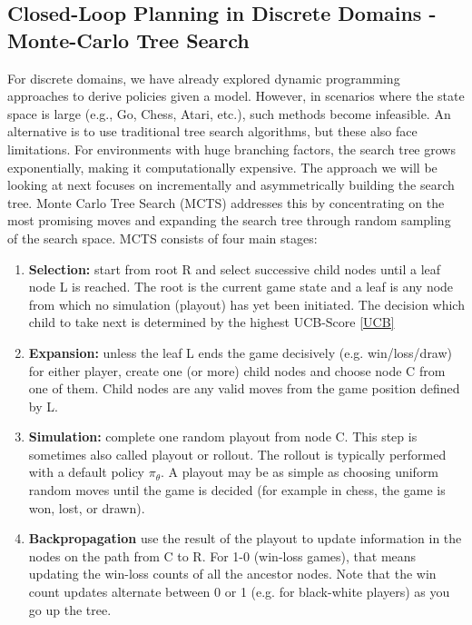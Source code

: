 \subsection{Closed-Loop Planning in Discrete Domains - Monte-Carlo Tree Search}
For discrete domains, we have already explored dynamic programming approaches to derive 
policies given a model. However, in scenarios where the state space is large (e.g., Go, 
Chess, Atari, etc.), such methods become infeasible. An alternative is to use traditional 
tree search algorithms, but these also face limitations. For environments with huge 
branching factors, the search tree grows exponentially, making it computationally 
expensive.\newline
The approach we will be looking at next focuses on incrementally and asymmetrically building the 
search tree. Monte Carlo Tree Search (MCTS) addresses this by concentrating on the most 
promising moves and expanding the search tree through random sampling of the search space. 
MCTS consists of four main stages:
\begin{enumerate}
    \item \textbf{Selection:} start from root R and select successive child nodes until a leaf node L is reached. The root is the current game state and a leaf is any node from which no simulation (playout) has yet been initiated. The decision which child to take next is determined by the highest UCB-Score \ref{UCB}
    
    \item \textbf{Expansion:} unless the leaf L ends the game decisively (e.g. win/loss/draw) for either player, create one (or more) child nodes and choose node C from one of them. Child nodes are any valid moves from the game position defined by L. 
    
    \item \textbf{Simulation:} complete one random playout from node C. This step is sometimes also called playout or rollout. The rollout is typically performed with a default policy $\pi_\theta$. A playout may be as simple as choosing uniform random moves until the game is decided (for example in chess, the game is won, lost, or drawn).
    
    \item \textbf{Backpropagation} use the result of the playout to update information in the nodes on the path from C to R. For 1-0 (win-loss games), that means updating the win-loss counts of all the ancestor nodes. Note that the win count updates alternate between 0 or 1 (e.g. for black-white players) as you go up the tree.
\end{enumerate}
